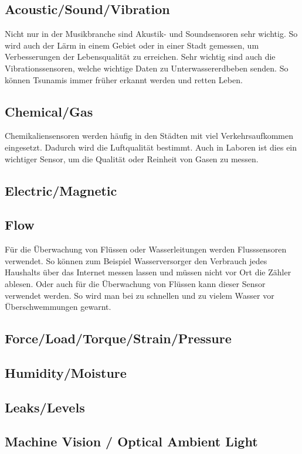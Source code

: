 \subsection{Acoustic/Sound/Vibration}
Nicht nur in der Musikbranche sind Akustik- und Soundsensoren sehr wichtig. So wird auch der Lärm in einem Gebiet oder in einer Stadt gemessen, um Verbesserungen der Lebensqualität zu erreichen. Sehr wichtig sind auch die Vibrationssensoren, welche wichtige Daten zu Unterwassererdbeben senden. So können Tsunamis immer früher erkannt werden und retten Leben. 
\subsection{Chemical/Gas}
Chemikaliensensoren werden häufig in den Städten mit viel Verkehrsaufkommen eingesetzt. Dadurch wird die Luftqualität bestimmt. Auch in Laboren ist dies ein wichtiger Sensor, um die Qualität oder Reinheit von Gasen zu messen. 
\subsection{Electric/Magnetic}

\subsection{Flow}
Für die Überwachung von Flüssen oder Wasserleitungen werden Flusssensoren verwendet. So können zum Beispiel Wasserversorger den Verbrauch jedes Haushalts über das Internet messen lassen und müssen nicht vor Ort die Zähler ablesen. Oder auch für die Überwachung von Flüssen kann dieser Sensor verwendet werden. So wird man bei zu schnellen und zu vielem Wasser vor Überschwemmungen gewarnt.
\subsection{Force/Load/Torque/Strain/Pressure}

\subsection{Humidity/Moisture}
\subsection{Leaks/Levels}
\subsection{Machine Vision / Optical Ambient Light}
